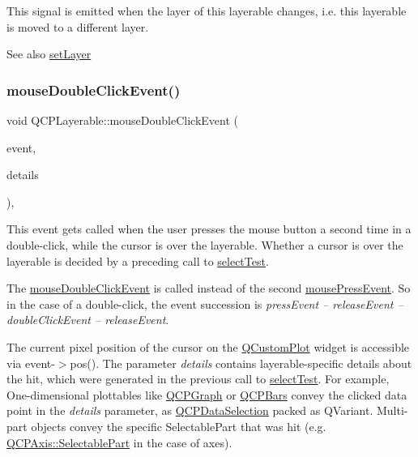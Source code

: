 This signal is emitted when the layer of this layerable changes, i.\+e. this layerable is moved to a different layer.

\begin{DoxySeeAlso}{See also}
\hyperlink{class_q_c_p_layerable_ab0d0da6d2de45a118886d2c8e16d5a54}{set\+Layer} 
\end{DoxySeeAlso}
\mbox{\label{class_q_c_p_layerable_a4171e2e823aca242dd0279f00ed2de81}} 
\subsubsection{\texorpdfstring{mouse\+Double\+Click\+Event()}{mouseDoubleClickEvent()}}
{\footnotesize\ttfamily void Q\+C\+P\+Layerable\+::mouse\+Double\+Click\+Event (\begin{DoxyParamCaption}\item[{Q\+Mouse\+Event $\ast$}]{event,  }\item[{const Q\+Variant \&}]{details }\end{DoxyParamCaption})\hspace{0.3cm}{\ttfamily [protected]}, {\ttfamily [virtual]}}

This event gets called when the user presses the mouse button a second time in a double-\/click, while the cursor is over the layerable. Whether a cursor is over the layerable is decided by a preceding call to \hyperlink{class_q_c_p_layerable_a04db8351fefd44cfdb77958e75c6288e}{select\+Test}.

The \hyperlink{class_q_c_p_layerable_a4171e2e823aca242dd0279f00ed2de81}{mouse\+Double\+Click\+Event} is called instead of the second \hyperlink{class_q_c_p_layerable_af6567604818db90f4fd52822f8bc8376}{mouse\+Press\+Event}. So in the case of a double-\/click, the event succession is {\itshape press\+Event -- release\+Event -- double\+Click\+Event -- release\+Event}.

The current pixel position of the cursor on the \hyperlink{class_q_custom_plot}{Q\+Custom\+Plot} widget is accessible via {\ttfamily event-\/$>$pos()}. The parameter {\itshape details} contains layerable-\/specific details about the hit, which were generated in the previous call to \hyperlink{class_q_c_p_layerable_a04db8351fefd44cfdb77958e75c6288e}{select\+Test}. For example, One-\/dimensional plottables like \hyperlink{class_q_c_p_graph}{Q\+C\+P\+Graph} or \hyperlink{class_q_c_p_bars}{Q\+C\+P\+Bars} convey the clicked data point in the {\itshape details} parameter, as \hyperlink{class_q_c_p_data_selection}{Q\+C\+P\+Data\+Selection} packed as Q\+Variant. Multi-\/part objects convey the specific {\ttfamily Selectable\+Part} that was hit (e.\+g. \hyperlink{class_q_c_p_axis_abee4c7a54c468b1385dfce2c898b115f}{Q\+C\+P\+Axis\+::\+Selectable\+Part} in the case of axes).

